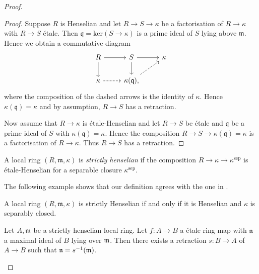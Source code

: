 \begin{proof}
\begin{proof}
    Suppose $R$ is Henselian and let $R \to S \to \kappa$ be a factorisation of $R \to \kappa$ with $R \to S$ étale. Then
    $\mathfrak{q} = \mathrm{ker}(S \to \kappa)$ is a prime ideal of $S$ lying above $\mathfrak{m}$. Hence we obtain a commutative
    diagram
    \[
        \begin{tikzcd}
        R \arrow{r} \arrow{d} & S \arrow{r} \arrow{d} & \kappa \\
        \kappa \arrow[dashed]{r} & \kappa(\mathfrak{q}) \arrow[dashed]{ur},
        \end{tikzcd}
    \] where the composition of the dashed arrows is the identity of $\kappa$. Hence $\kappa(\mathfrak{q}) = \kappa$ and by assumption,
    $R \to S$ has a retraction.

    Now assume that $R \to \kappa$ is étale-Henselian and let $R \to S$ be étale and $\mathfrak{q}$ be a prime ideal of $S$ with
    $\kappa(\mathfrak{q}) = \kappa$. Hence the composition $R \to S \to \kappa(\mathfrak{q}) = \kappa$ is a factorisation
    of $R \to \kappa$. Thus $R \to S$ has a retraction.
\end{proof}


\begin{definition}
    \label{def:strictly-henselian-local-ring}
    A local ring $(R, \mathfrak{m}, \kappa)$ is \emph{strictly henselian} if the composition $R \to \kappa \to \kappa^{\mathrm{sep}}$ is étale-Henselian
    for a separable closure $\kappa^{\mathrm{sep}}$.
\end{definition}

The following example shows that our definition agrees with the one in
\cite[\href{https://stacks.math.columbia.edu/tag/04GF}{Tag 04GF}]{stacks-project}.

\begin{example}
    A local ring $(R, \mathfrak{m}, \kappa)$ is strictly Henselian if and only if it is Henselian and $\kappa$ is separably closed.
\end{example}

\begin{proposition}
    \label{thm:strictly-henselian-good-retraction}
    Let \(A, {\mathfrak{m}}\) be a strictly henselian local ring. Let \(f : A \to B\) a \'etale ring map with \({\mathfrak{n}}\) a maximal ideal of \(B\) lying over \({\mathfrak{m}}\). Then there exists a retraction \(s : B \to A\) of \(A \to B\) such that \({\mathfrak{n}} = s^{-1}({\mathfrak{m}})\).
\end{proposition}


\end{proof}
